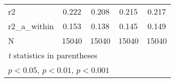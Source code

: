 {\begin{tabular}{l*{4}{c}}
\hline
r2          &       0.222         &       0.208         &       0.215         &       0.217         \\
r2\_a\_within &       0.153         &       0.138         &       0.145         &       0.149         \\
N           &       15040         &       15040         &       15040         &       15040         \\
\hline\hline
\multicolumn{5}{l}{\footnotesize \textit{t} statistics in parentheses}\\
\multicolumn{5}{l}{\footnotesize \sym{*} \(p<0.05\), \sym{**} \(p<0.01\), \sym{***} \(p<0.001\)}\\
\end{tabular}
}
